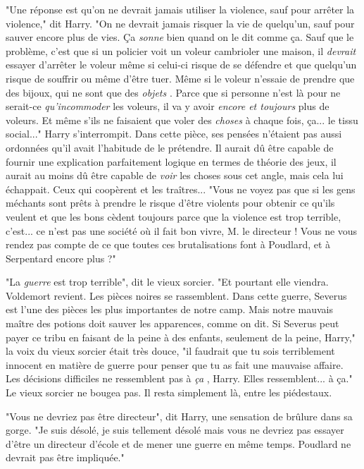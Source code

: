 "Une réponse est qu'on ne devrait jamais utiliser la violence, sauf pour arrêter la violence," dit Harry. "On ne devrait jamais risquer la vie de quelqu'un, sauf pour sauver encore plus de vies. Ça \emph{sonne}  bien quand on le dit comme ça. Sauf que le problème, c'est que si un policier voit un voleur cambrioler une maison, il \emph{devrait}  essayer d'arrêter le voleur même si celui-ci risque de se défendre et que quelqu'un risque de souffrir ou même d'être tuer. Même si le voleur n'essaie de prendre que des bijoux, qui ne sont que des \emph{objets} . Parce que si personne n'est là pour ne serait-ce \emph{qu'incommoder}  les voleurs, il va y avoir \emph{encore et toujours}  plus de voleurs. Et même s'ils ne faisaient que voler des \emph{choses}  à chaque fois, ça... le tissu social..." Harry s'interrompit. Dans cette pièce, ses pensées n'étaient pas aussi ordonnées qu'il avait l'habitude de le prétendre. Il aurait dû être capable de fournir une explication parfaitement logique en termes de théorie des jeux, il aurait au moins dû être capable de \emph{voir}  les choses sous cet angle, mais cela lui échappait. Ceux qui coopèrent et les traîtres... "Vous ne voyez pas que si les gens méchants sont prêts à prendre le risque d'être violents pour obtenir ce qu'ils veulent et que les bons cèdent toujours parce que la violence est trop terrible, c'est... ce n'est pas une société où il fait bon vivre, M. le directeur ! Vous ne vous rendez pas compte de ce que toutes ces brutalisations font à Poudlard, et à Serpentard encore plus ?"

"La \emph{guerre}  est trop terrible", dit le vieux sorcier. "Et pourtant elle viendra. Voldemort revient. Les pièces noires se rassemblent. Dans cette guerre, Severus est l'une des pièces les plus importantes de notre camp. Mais notre mauvais maître des potions doit sauver les apparences, comme on dit. Si Severus peut payer ce tribu en faisant de la peine à des enfants, seulement de la peine, Harry," la voix du vieux sorcier était très douce, "il faudrait que tu sois terriblement innocent en matière de guerre pour penser que tu as fait une mauvaise affaire. Les décisions difficiles ne ressemblent pas à \emph{ça} , Harry. Elles ressemblent... à ça." Le vieux sorcier ne bougea pas. Il resta simplement là, entre les piédestaux.

"Vous ne devriez pas être directeur", dit Harry, une sensation de brûlure dans sa gorge. "Je suis désolé, je suis tellement désolé mais vous ne devriez pas essayer d'être un directeur d'école et de mener une guerre en même temps. Poudlard ne devrait pas être impliquée."

